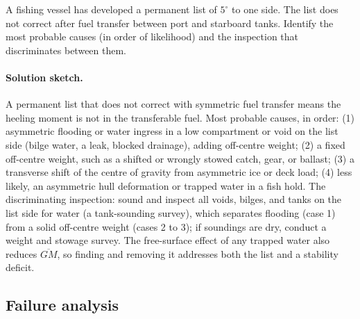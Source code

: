 \begin{exercise}
A fishing vessel has developed a permanent list of $5^{\circ}$
to one side. The list does not correct after fuel transfer
between port and starboard tanks. Identify the most probable
causes (in order of likelihood) and the inspection that
discriminates between them.

\paragraph{Solution sketch.} A permanent list that does not correct with
symmetric fuel transfer means the heeling moment is not in the
transferable fuel. Most probable causes, in order: (1) asymmetric
flooding or water ingress in a low compartment or void on the list side
(bilge water, a leak, blocked drainage), adding off-centre weight; (2) a
fixed off-centre weight, such as a shifted or wrongly stowed catch, gear,
or ballast; (3) a transverse shift of the centre of gravity from
asymmetric ice or deck load; (4) less likely, an asymmetric hull
deformation or trapped water in a fish hold. The discriminating
inspection: sound and inspect all voids, bilges, and tanks on the list
side for water (a tank-sounding survey), which separates flooding
(case 1) from a solid off-centre weight (cases 2 to 3); if soundings are
dry, conduct a weight and stowage survey. The free-surface effect of any
trapped water also reduces $\overline{GM}$, so finding and removing it
addresses both the list and a stability deficit.
\end{exercise}

\subsection*{Failure analysis}

